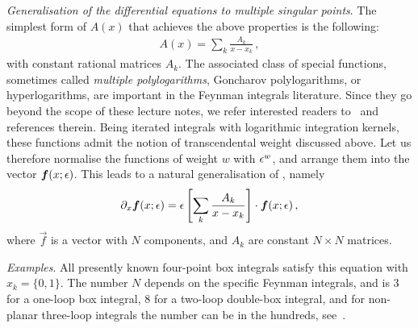 \smallskip

{\it Generalisation of the differential equations to multiple singular points}.
The simplest form of $A(x)$ that achieves the above properties is the following:
\begin{align}
A(x) = \sum_{k} \frac{A_{k}}{x-x_{k}} \,,
\end{align}
with constant rational matrices $A_k$.
The associated class of special functions, sometimes called \emph{multiple polylogarithms}, Goncharov polylogarithms, or hyperlogarithms, are important in the Feynman integrals literature.
Since they go beyond the scope of these lecture notes, we refer interested readers to~\cite{ch4Duhr:2019wtr} and references therein.
Being iterated integrals with logarithmic integration kernels, these functions admit the notion of transcendental weight
discussed above. Let us therefore normalise the functions of weight $w$ with $\epsilon^{w}$, and arrange them into the vector $\vec{f}(x;\eps)$.
This leads to a natural generalisation of , namely
\begin{align}
\label{eq:canonicalDEmanysingularpoints}
\partial_x \vec{f}(x;\eps) = \eps \left[ \sum_k \frac{A_{k}}{x-x_{k}} \right] \cdot \vec{f}(x;\eps) \,,
\end{align}
where $\vec{f}$ is a vector with $N$ components, and $A_{k}$ are constant $N \times N$ matrices.

\smallskip

{\it Examples}. All presently known four-point box integrals satisfy this equation with $x_{k} = \{0,1\}$. 
The number $N$ depends on the specific Feynman integrals, and is $3$ for a one-loop box integral, $8$ for a two-loop double-box integral, 
and for non-planar three-loop integrals the number can be in the hundreds, see~\cite{ch4Henn:2020lye}.


\smallskip

